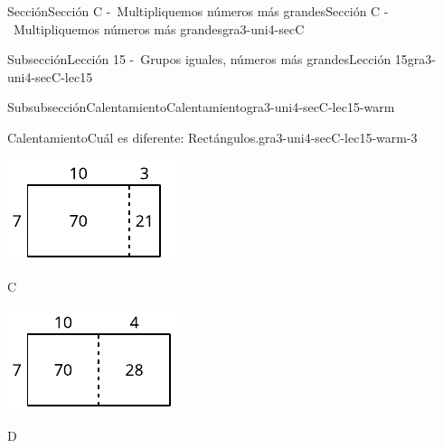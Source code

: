 \documentclass[twoside,10pt,]{article}
\begin{document}
\begin{sectionptx}{Sección}{Sección C -~Multipliquemos números más grandes}{}{Sección C -~Multipliquemos números más grandes}{}{}{gra3-uni4-secC}
\begin{subsectionptx}{Subsección}{Lección 15 -~Grupos iguales, números más grandes}{}{Lección 15}{}{}{gra3-uni4-secC-lec15}
\begin{subsubsectionptx}{Subsubsección}{Calentamiento}{}{Calentamiento}{}{}{gra3-uni4-secC-lec15-warm}
\begin{exploration}{Calentamiento}{Cuál es diferente: Rectángulos.}{gra3-uni4-secC-lec15-warm-3}
\begin{sidebyside}{2}{0}{0}{0}
\begin{sbspanel}{0.5}
\includegraphics[width=\linewidth]{external/svg-source/tikz-file-149351.pdf}
\end{sbspanel}%
\end{sidebyside}%
\begin{sidebyside}{2}{0}{0}{0}%
\begin{sbspanel}{0.5}%
C%
\par
\includegraphics[width=\linewidth]{external/svg-source/tikz-file-149352.pdf}
\end{sbspanel}%
\begin{sbspanel}{0.5}%
D%
\par

\end{sbspanel}
\end{sidebyside}
\end{exploration}
\end{subsubsectionptx}
\end{subsectionptx}
\end{sectionptx}
\end{document}
